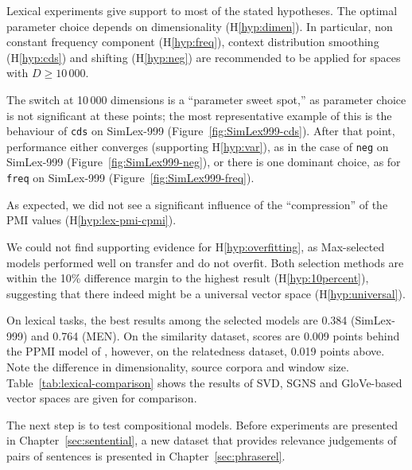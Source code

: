 Lexical experiments give support to most of the stated hypotheses. The optimal parameter choice depends on dimensionality (H\ref{hyp:dimen}). In particular, non constant frequency component (H\ref{hyp:freq}), context distribution smoothing (H\ref{hyp:cds}) and shifting (H\ref{hyp:neg}) are recommended to be applied for spaces with $D \geq 10\,000$.

The switch at 10\,000 dimensions is a ``parameter sweet spot,'' as parameter choice is not significant at these points; the most representative example of this is the behaviour of \texttt{cds} on SimLex-999 (Figure~\ref{fig:SimLex999-cds}). After that point, performance either converges (supporting H\ref{hyp:var}), as in the case of \texttt{neg} on SimLex-999 (Figure~\ref{fig:SimLex999-neg}), or there is one dominant choice, as for \texttt{freq} on SimLex-999 (Figure~\ref{fig:SimLex999-freq}).

As expected, we did not see a significant influence of the ``compression'' of the PMI values (H\ref{hyp:lex-pmi-cpmi}).

We could not find supporting evidence for H\ref{hyp:overfitting}, as Max-selected models performed well on transfer and do not overfit. Both selection methods are within the 10\% difference margin to the highest result (H\ref{hyp:10percent}), suggesting that there indeed might be a universal vector space (H\ref{hyp:universal}).


On lexical tasks, the best results among the selected models are 0.384 (SimLex-999) and 0.764 (MEN). On the similarity dataset, scores are 0.009 points behind the PPMI model of , however, on the relatedness dataset, 0.019 points above. Note the difference in dimensionality, source corpora and window size. Table~\ref{tab:lexical-comparison} shows the results of SVD, SGNS and GloVe-based vector spaces are given for comparison.

The next step is to test compositional models. Before experiments are presented in Chapter~\ref{sec:sentential}, a new dataset that provides relevance judgements of pairs of sentences is presented in Chapter~\ref{sec:phraserel}.

